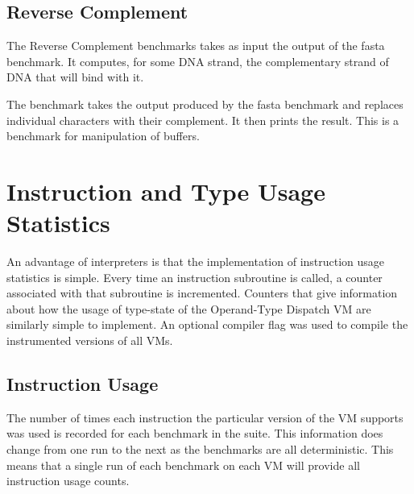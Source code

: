 \documentclass[english,a4paper,12pt]{report}
\begin{document}
\subsection{Reverse Complement}

The Reverse Complement benchmarks takes as input the output of the
fasta benchmark. It computes, for some DNA strand, the complementary
strand of DNA that will bind with it. 

The benchmark takes the output produced by the fasta benchmark and
replaces individual characters with their complement. It then prints
the result. This is a benchmark for manipulation of buffers.

\section{Instruction and Type Usage Statistics}

An advantage of interpreters is that the implementation of instruction
usage statistics is simple. Every time an instruction subroutine is
called, a counter associated with that subroutine is
incremented. Counters that give information about how the usage of
type-state of the Operand-Type Dispatch VM are similarly simple to
implement. An optional compiler flag was used to compile the
instrumented versions of all VMs.

\subsection{Instruction Usage}

The number of times each instruction the particular version of the VM
supports was used is recorded for each benchmark in the
suite. This information does change from one run to the next as
the benchmarks are all deterministic. This means that a single run of
each benchmark on each VM will provide all instruction usage counts. 
\end{document}
